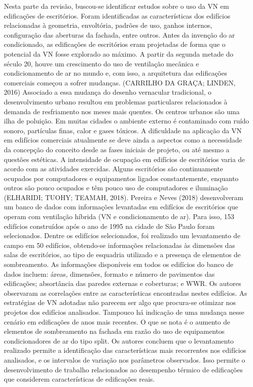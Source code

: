 \documentclass[brazil,hardcopy,openany,a5paper]{ufscthesis}
\begin{document}
	Nesta parte da revisão, buscou-se identificar estudos sobre o uso da VN em edificações de escritórios. Foram identificadas as características dos edifícios relacionadas à geometria, envoltória, padrões de uso, ganhos internos, configuração das aberturas da fachada, entre outros.
	Antes da invenção do ar condicionado, as edificações de escritórios eram projetadas de forma que o potencial da VN fosse explorado ao máximo. A partir da segunda metade do século 20, houve um crescimento do uso de ventilação mecânica e condicionamento de ar no mundo e, com isso, a arquitetura das edificações comerciais começou a sofrer mudanças. (CARRILHO DA GRAÇA; LINDEN, 2016) Associado a essa mudança do desenho vernacular tradicional, o desenvolvimento urbano resultou em problemas particulares relacionados à demanda de resfriamento nos meses mais quentes. Os centros urbanos são uma ilha de poluição. Em muitas cidades o ambiente externo é contaminado com ruído sonoro, partículas finas, calor e gases tóxicos. A dificuldade na aplicação da VN em edifícios comerciais atualmente se deve ainda a aspectos como a necessidade da concepção do conceito desde as fases iniciais de projeto, ou até mesmo a questões estéticas.
	A intensidade de ocupação em edifícios de escritórios varia de acordo com as atividades exercidas. Alguns escritórios são continuamente ocupados por computadores e equipamentos ligados constantemente, enquanto outros são pouco ocupados e têm pouco uso de computadores e iluminação (ELHARIDI; TUOHY; TEAMAH, 2018).
	Pereira e Neves (2018) desenvolveram um banco de dados com informações levantadas em edifícios de escritórios que operam com ventilação híbrida (VN e condicionamento de ar). Para isso, 153 edifícios construídos após o ano de 1995 na cidade de São Paulo foram selecionados. Dentre os edifícios selecionados, foi realizado um levantamento de campo em 50 edifícios, obtendo-se informações relacionadas às dimensões das salas de escritórios, ao tipo de esquadria utilizado e a presença de elementos de sombreamento. As informações disponíveis em todos os edifícios do banco de dados incluem: áreas, dimensões, formato e número de pavimentos das edificações; absortância das paredes externas e coberturas; e WWR. Os autores observaram as correlações entre as características encontradas nestes edifícios. As estratégias de VN adotadas não parecem ser algo que procura-se otimizar nos projetos dos edifícios analisados. Tampouco há indicação de uma mudança nesse cenário em edificações de anos mais recentes. O que se nota é o aumento de elementos de sombreamento na fachada em razão do uso de equipamentos condicionadores de ar do tipo split. Os autores concluem que o levantamento realizado permite a identificação das características mais recorrentes nos edifícios analisados, e os intervalos de variação nos parâmetros observados.
	Isso permite o desenvolvimento de trabalho relacionados ao desempenho térmico de edificações que considerem características de edificações reais.
	
\end{document}
